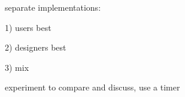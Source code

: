 

separate implementations:

1) users best

2) designers best

3) mix

experiment to compare and discuss, use a timer